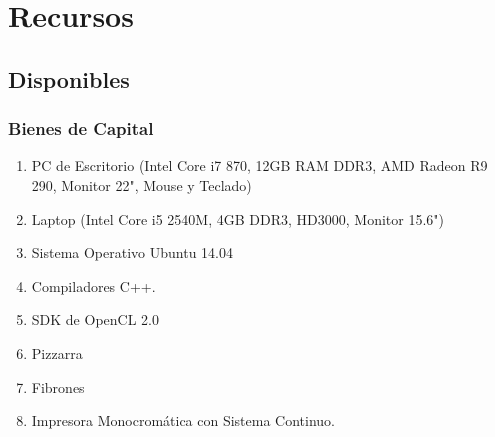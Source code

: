 %
%
%





%
	
\section{Recursos}	
	 \subsection{Disponibles}

	 	\subsubsection{Bienes de Capital}
	 	
	 	\begin{enumerate}
	 	\item PC de Escritorio (Intel Core i7 870, 12GB RAM DDR3, AMD Radeon R9 290, Monitor 22", Mouse y Teclado)
	 	\item Laptop (Intel Core i5 2540M, 4GB DDR3, HD3000, Monitor 15.6")
	 	\item Sistema Operativo Ubuntu 14.04
	 	\item Compiladores C++.
	 	\item SDK de OpenCL 2.0
		\item Pizzarra
		\item Fibrones
		\item Impresora Monocromática con Sistema Continuo.
	 	\end{enumerate}

